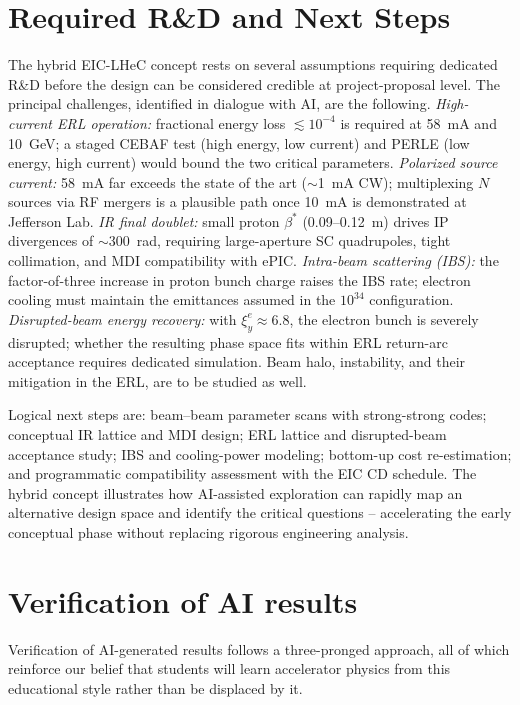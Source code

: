 \documentclass[%
               refpage,       %
               biblatex,     %
               hyphens,      %
               ]{jacow}
\begin{document}
 
\section{Required R\&D and Next Steps}

The hybrid EIC-LHeC concept rests on several assumptions requiring 
dedicated R\&D before the design can be considered credible at 
project-proposal level. The principal challenges, identified in dialogue 
with AI, are the following. \textit{High-current ERL operation:} 
fractional energy loss $\lesssim 10^{-4}$ is required at 58~mA and 
10~GeV; a staged CEBAF test (high energy, low current) and PERLE 
(low energy, high current) would bound the two critical parameters. 
\textit{Polarized source current:} 58~mA far exceeds the state of the 
art ($\sim$1~mA CW); multiplexing $N$ sources via RF mergers is a 
plausible path once 10~mA is demonstrated at Jefferson Lab. 
\textit{IR final doublet:} small proton $\beta^*$ (0.09--0.12~m) drives 
IP divergences of $\sim$300~\textmu rad, requiring large-aperture SC 
quadrupoles, tight collimation, and MDI compatibility with ePIC. 
\textit{Intra-beam scattering (IBS):} the factor-of-three increase in proton 
bunch charge raises the IBS rate; electron cooling must maintain the 
emittances assumed in the $10^{34}$ configuration. 
\textit{Disrupted-beam energy recovery:} with $\xi_y^e \approx 6.8$, 
the electron bunch is severely disrupted; whether the resulting 
phase space fits within ERL return-arc acceptance requires dedicated 
simulation. 
Beam halo, instability, and their mitigation in the ERL, are to be studied as well.

Logical next steps are: beam--beam parameter scans with strong-strong 
codes; conceptual IR lattice and MDI design; ERL lattice and 
disrupted-beam acceptance study; IBS and cooling-power modeling; 
bottom-up cost re-estimation; and programmatic compatibility assessment 
with the EIC CD schedule. The hybrid concept illustrates how 
AI-assisted exploration can rapidly map an alternative design space 
and identify the critical questions -- accelerating the early 
conceptual phase without replacing rigorous engineering analysis.



\section{Verification of AI results}

Verification of AI-generated results follows a three-pronged approach, all of which reinforce our belief that students will learn accelerator physics from this educational style rather than be displaced by it.
\end{document}
